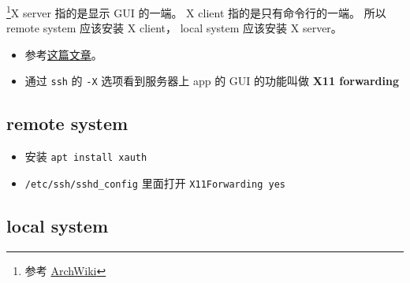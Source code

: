 
\begin{issues}
\issueDraft
\end{issues}

\footnote{参考 \href{https://wiki.archlinux.org/title/xorg}{ArchWiki}}X server 指的是显示 GUI 的一端。 X client 指的是只有命令行的一端。 所以 remote system 应该安装 X client， local system 应该安装 X server。

\begin{itemize}
\item 参考\href{https://ostechnix.com/how-to-configure-x11-forwarding-using-ssh-in-linux/}{这篇文章}。
\item 通过 \verb|ssh| 的 \verb|-X| 选项看到服务器上 app 的 GUI 的功能叫做 \textbf{X11 forwarding}
\end{itemize}


\subsection{remote system}
\begin{itemize}
\item 安装 \verb|apt install xauth|
\item \verb|/etc/ssh/sshd_config| 里面打开 \verb|X11Forwarding yes|
\end{itemize}


\subsection{local system}

